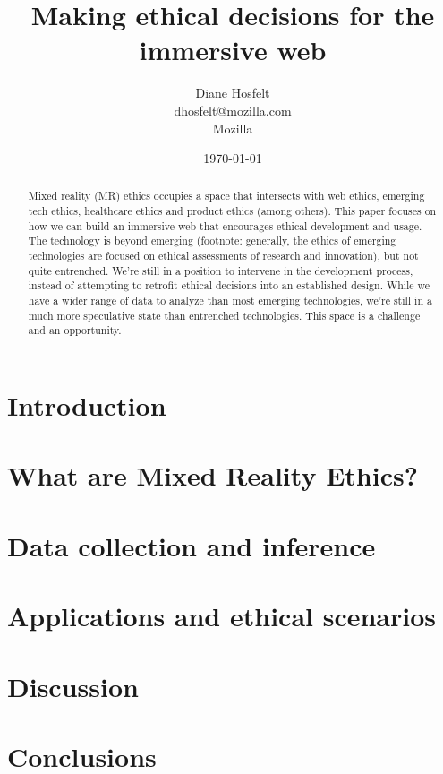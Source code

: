 \documentclass[conference]{IEEEtran}
\title{Making ethical decisions for the immersive web}
\author{Diane Hosfelt \\ dhosfelt@mozilla.com \\ Mozilla \\ }
\date{\today}
\begin{document}
\maketitle

\begin{abstract}
Mixed reality (MR) ethics occupies a space that intersects with web ethics, emerging tech ethics, healthcare ethics and product ethics (among others). This paper focuses on how we can build an immersive web that encourages ethical development and usage. The technology is beyond emerging (footnote: generally, the ethics of emerging technologies are focused on ethical assessments of research and innovation), but not quite entrenched. We're still in a position to intervene in the development process, instead of attempting to retrofit ethical decisions into an established design. While we have a wider range of data to analyze than most emerging technologies, we're still in a much more speculative state than entrenched technologies. This space is a challenge and an opportunity.
\end{abstract}

\section{Introduction}


\section{What are Mixed Reality Ethics?}


\section{Data collection and inference}\label{sec:data}


\section{Applications and ethical scenarios}


\section{Discussion}


\section{Conclusions}


\balance
{}

\end{document}
